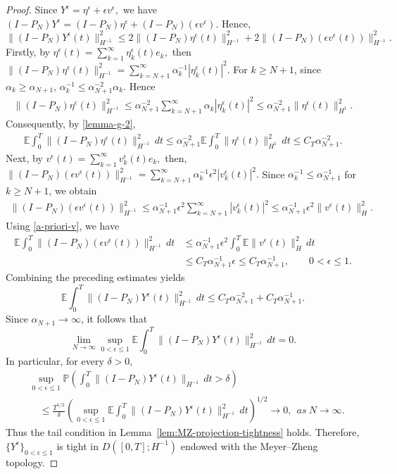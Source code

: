 \documentclass[10pt,a4paper]{amsart}
\theoremstyle{plain}
\numberwithin{equation}{section}
\begin{document}
\begin{proof}
Since \(Y^\epsilon=\eta^\epsilon+\epsilon v^\epsilon,\) we have \((I-P_N)Y^\epsilon=(I-P_N)\eta^\epsilon+(I-P_N)(\epsilon v^\epsilon).\)
Hence,
\[
\|(I-P_N)Y^\epsilon(t)\|_{H^{-1}}^2 \le 2\|(I-P_N)\eta^\epsilon(t)\|_{H^{-1}}^2 + 2\|(I-P_N)(\epsilon v^\epsilon(t))\|_{H^{-1}}^2 .
\]
Firstly,  by \(\eta^\epsilon(t)=\sum_{k=1}^\infty \eta_k^\epsilon(t)e_k,\)
then
\(
\|(I-P_N)\eta^\epsilon(t)\|_{H^{-1}}^2 = \sum_{k=N+1}^\infty \alpha_k^{-1}|\eta_k^\epsilon(t)|^2 .
\)
For \(k\ge N+1\), since \(\alpha_k\ge \alpha_{N+1}\), \(\alpha_k^{-1} \le \alpha_{N+1}^{-2}\alpha_k . \) Hence
\[
\begin{aligned}
\|(I-P_N)\eta^\epsilon(t)\|_{H^{-1}}^2 \le\alpha_{N+1}^{-2}\sum_{k=N+1}^\infty\alpha_k|\eta_k^\epsilon(t)|^2 
 \le \alpha_{N+1}^{-2}\|\eta^\epsilon(t)\|_{H^1}^2 .
\end{aligned}
\]
Consequently, by \eqref{lemma-g-2},
\[
\begin{aligned}
\mathbb E\int_0^T \|(I-P_N)\eta^\epsilon(t)\|_{H^{-1}}^2\,dt
 \le \alpha_{N+1}^{-2}\mathbb E\int_0^T\|\eta^\epsilon(t)\|_{H^1}^2\,dt  \le C_T\alpha_{N+1}^{-2}.
\end{aligned}
\]
Next, by \(v^\epsilon(t)=\sum_{k=1}^\infty v_k^\epsilon(t)e_k,\) then,
\(
\|(I-P_N)(\epsilon v^\epsilon(t))\|_{H^{-1}}^2=\sum_{k=N+1}^\infty\alpha_k^{-1}\epsilon^2|v_k^\epsilon(t)|^2 .
\)
Since \(\alpha_k^{-1}\le \alpha_{N+1}^{-1}\) for \(k\ge N+1\), we obtain
\[
\begin{aligned}
\|(I-P_N)(\epsilon v^\epsilon(t))\|_{H^{-1}}^2 \le\alpha_{N+1}^{-1}\epsilon^2\sum_{k=N+1}^\infty |v_k^\epsilon(t)|^2    
 \le \alpha_{N+1}^{-1}\epsilon^2\|v^\epsilon(t)\|_H^2 .
\end{aligned}
\]
Using \eqref{a-priori-v}, we have
\[
\begin{aligned}
\mathbb E\int_0^T
\|(I-P_N)(\epsilon v^\epsilon(t))\|_{H^{-1}}^2\,dt
&\le
\alpha_{N+1}^{-1}
\epsilon^2
\int_0^T
\mathbb E\|v^\epsilon(t)\|_H^2\,dt        \\
&\le
C_T\alpha_{N+1}^{-1}\epsilon    \le
C_T\alpha_{N+1}^{-1},
\qquad 0<\epsilon\le1 .
\end{aligned}
\]
Combining the preceding estimates yields
\[
\mathbb E\int_0^T
\|(I-P_N)Y^\epsilon(t)\|_{H^{-1}}^2\,dt
\le
C_T\alpha_{N+1}^{-2}
+
C_T\alpha_{N+1}^{-1}.
\]
Since \(\alpha_{N+1}\to\infty\), it follows that
\[
\lim_{N\to\infty}
\sup_{0<\epsilon\le1}
\mathbb E\int_0^T
\|(I-P_N)Y^\epsilon(t)\|_{H^{-1}}^2\,dt
=0.
\]
In particular, for every \(\delta>0\),
\[
\begin{aligned}
&\sup_{0<\epsilon\le1}
\mathbb P
\left(
\int_0^T
\|(I-P_N)Y^\epsilon(t)\|_{H^{-1}}\,dt>\delta
\right)                                                     \\
&\quad\le
\frac{T^{1/2}}{\delta}
\left(
\sup_{0<\epsilon\le1}
\mathbb E\int_0^T
\|(I-P_N)Y^\epsilon(t)\|_{H^{-1}}^2\,dt
\right)^{1/2}
\longrightarrow 0,~~ as ~N\to\infty. 
\end{aligned}
\]
Thus the  tail condition in
Lemma~\ref{lem:MZ-projection-tightness} holds. Therefore, \(\{Y^\epsilon\}_{0<\epsilon\le1}\)
is tight in \(D([0,T];H^{-1})\) endowed with the Meyer--Zheng topology.


\end{proof}
\end{document}
